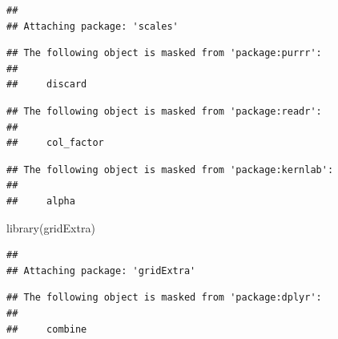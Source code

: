 \documentclass[
]{book}
\newenvironment{Shaded}{\begin{snugshade}}{\end{snugshade}}
\newcommand{\FunctionTok}[1]{\textcolor[rgb]{0.00,0.00,0.00}{#1}}
\newcommand{\NormalTok}[1]{#1}
\begin{document}
\begin{verbatim}
## 
## Attaching package: 'scales'
\end{verbatim}

\begin{verbatim}
## The following object is masked from 'package:purrr':
## 
##     discard
\end{verbatim}

\begin{verbatim}
## The following object is masked from 'package:readr':
## 
##     col_factor
\end{verbatim}

\begin{verbatim}
## The following object is masked from 'package:kernlab':
## 
##     alpha
\end{verbatim}

\begin{Shaded}
\begin{Highlighting}[]
\FunctionTok{library}\NormalTok{(gridExtra)}
\end{Highlighting}
\end{Shaded}

\begin{verbatim}
## 
## Attaching package: 'gridExtra'
\end{verbatim}

\begin{verbatim}
## The following object is masked from 'package:dplyr':
## 
##     combine
\end{verbatim}
\end{document}
